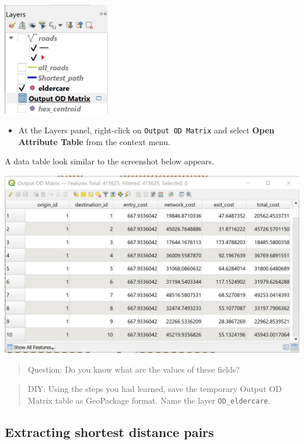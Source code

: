 \documentclass[
  letterpaper,
  DIV=11,
  numbers=noendperiod]{scrreprt}
\providecommand{\tightlist}{%
  \setlength{\itemsep}{0pt}\setlength{\parskip}{0pt}}\usepackage{longtable,booktabs,array}
\begin{document}
\includegraphics[width=0.35\textwidth,height=\textheight]{./img09/image28.jpg}

\begin{itemize}
\tightlist
\item
  At the Layers panel, right-click on \texttt{Output\ OD\ Matrix} and
  select \textbf{Open Attribute Table} from the context menu.
\end{itemize}

A data table look similar to the screenshot below appears.

\includegraphics{./img09/image29.jpg}

\begin{quote}
Question: Do you know what are the values of these fields?
\end{quote}

\begin{quote}
DIY: Using the steps you had learned, save the temporary Output OD
Matrix table as GeoPackage format. Name the layer
\texttt{OD\_eldercare}.
\end{quote}

\hypertarget{extracting-shortest-distance-pairs}{%
\subsection{Extracting shortest distance
pairs}\label{extracting-shortest-distance-pairs}}
\end{document}
